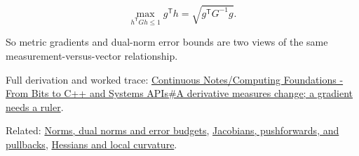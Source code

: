 \[
\max_{h^{\mathsf T}Gh\le1} g^{\mathsf T}h
=
\sqrt{g^{\mathsf T}G^{-1}g}.
\]

So metric gradients and dual-norm error bounds are two views of the same measurement-versus-vector relationship.

Full derivation and worked trace: \hyperref[01-foundations-i-ch018-a-derivative-measures-change-a-gradient-needs-a-ruler]{Continuous Notes/Computing Foundations - From Bits to C++ and Systems APIs\#A derivative measures change; a gradient needs a ruler}.

Related: \hyperref[appendix-d6d9dbbe3c14]{Norms, dual norms and error budgets}, \hyperref[appendix-d8a7ddb675eb]{Jacobians, pushforwards, and pullbacks}, \hyperref[appendix-6ac071f8b50c]{Hessians and local curvature}.
